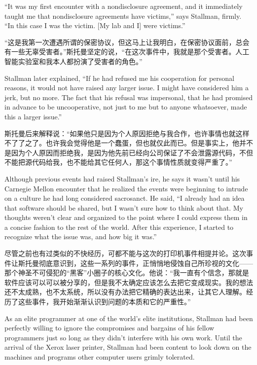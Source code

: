 \ifdefined\eng
``It was my first encounter with a nondisclosure agreement, and it immediately taught me that nondisclosure agreements have victims,'' says Stallman, firmly. ``In this case I was the victim. [My lab and I] were victims.''
\fi

\ifdefined\chs
“这是我第一次遭遇所谓的保密协议，但这马上让我明白，在保密协议面前，总会有一些无辜受害者。”斯托曼坚定的说，“在这次事件中，我就是那个受害者。人工智能实验室和我本人都扮演了受害者的角色。”
\fi

\ifdefined\eng
Stallman later explained, ``If he had refused me his cooperation for personal reasons, it would not have raised any larger issue.  I might have considered him a jerk, but no more.  The fact that his refusal was impersonal, that he had promised in advance to be uncooperative, not just to me but to anyone whatsoever, made this a larger issue.''
\fi

\ifdefined\chs
斯托曼后来解释说：“如果他只是因为个人原因拒绝与我合作，也许事情也就这样不了了之了。也许我会觉得他是一个蠢蛋，但也就仅此而已。但是事实上，他并不是因为个人原因而拒绝我，是因为他先前已经向公司保证了不会泄露源代码，不但不能把源代码给我，也不能给其它任何人，那这个事情性质就变得严重了。”
\fi

\ifdefined\eng
Although previous events had raised Stallman's ire, he says it wasn't until his Carnegie Mellon encounter that he realized the events were beginning to intrude on a culture he had long considered sacrosanct.  He said, ``I already had an idea that software should be shared, but I wasn't sure how to think about that. My thoughts weren't clear and organized to the point where I could express them in a concise fashion to the rest of the world. After this experience, I started to recognize what the issue was, and how big it was.''
\fi

\ifdefined\chs
尽管之前也有过类似的不快经历，可都不能与这次的打印机事件相提并论。这次事件让斯托曼彻底意识到，这些一系列的事件，正悄悄地侵蚀自己所珍视的文化——那个神圣不可侵犯的“黑客”小圈子的核心文化。他说：“我一直有个信念，那就是软件应该可以可以被分享的，但是我不太确定应该怎么去把它变成现实。我的想法还不太成熟，也不太系统，所以没有办法把它精确的表达出来，让其它人理解。经历了这些事件，我开始渐渐认识到问题的本质和它的严重性。”
\fi

\ifdefined\eng
As an elite programmer at one of the world's elite institutions, Stallman had been perfectly willing to ignore the compromises and bargains of his fellow programmers just so long as they didn't interfere with his own work. Until the arrival of the Xerox laser printer, Stallman had been content to look down on the machines and programs other computer users grimly tolerated.
\fi

